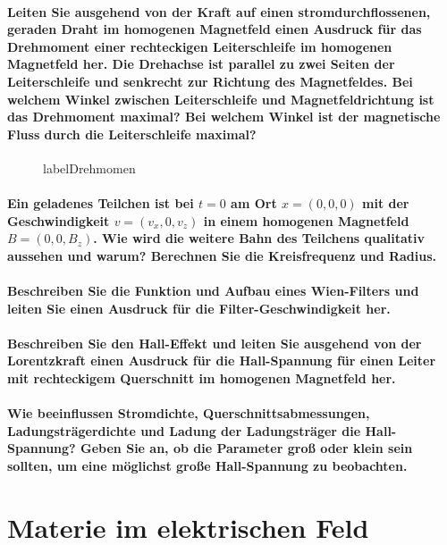 \documentclass[a4paper, 11pt, parskip=half]{scrartcl}
\begin{document}
\paragraph{Leiten Sie ausgehend von der Kraft auf einen stromdurchflossenen, geraden Draht im
homogenen Magnetfeld einen Ausdruck für das Drehmoment einer rechteckigen Leiterschleife im
homogenen Magnetfeld her. Die Drehachse ist parallel zu zwei Seiten der Leiterschleife und senkrecht
zur Richtung des Magnetfeldes. Bei welchem Winkel zwischen Leiterschleife und Magnetfeldrichtung ist
das Drehmoment maximal? Bei welchem Winkel ist der magnetische Fluss durch die Leiterschleife
maximal?}
\begin{figure}
    label{Drehmomen}
\end{figure}

\paragraph{Ein geladenes Teilchen ist bei $t=0$ am Ort $x=(0,0,0)$ mit der Geschwindigkeit
$v=(v_x,0,v_z)$ in einem homogenen Magnetfeld $B=(0,0,B_z)$. Wie wird die weitere Bahn des Teilchens
qualitativ aussehen und warum? Berechnen Sie die Kreisfrequenz und Radius.}

\paragraph{Beschreiben Sie die Funktion und Aufbau eines Wien-Filters und leiten Sie einen Ausdruck
für die Filter-Geschwindigkeit her.}

\paragraph{Beschreiben Sie den Hall-Effekt und leiten Sie ausgehend von der Lorentzkraft einen
Ausdruck für die Hall-Spannung für einen Leiter mit rechteckigem Querschnitt im homogenen Magnetfeld
her.}

\paragraph{Wie beeinflussen Stromdichte, Querschnittsabmessungen, Ladungsträgerdichte und Ladung
der Ladungsträger die Hall-Spannung? Geben Sie an, ob die Parameter groß oder klein sein sollten, um
eine möglichst große Hall-Spannung zu beobachten.}

\newpage

\section{Materie im elektrischen Feld}
\end{document}
